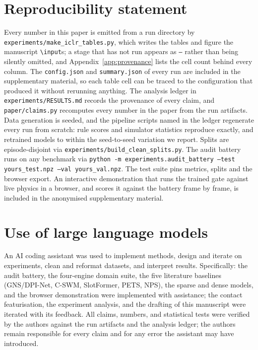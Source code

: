 \documentclass{article}
\begin{document}
\section*{Reproducibility statement}
Every number in this paper is emitted from a run directory by
\texttt{experiments/make\_iclr\_tables.py}, which writes the tables and figure the manuscript
\texttt{\textbackslash input}s; a stage that has not run appears as \texttt{--} rather than
being silently omitted, and Appendix~\ref{app:provenance} lists the cell count behind every
column. The \texttt{config.json} and \texttt{summary.json} of every run are included in the
supplementary material, so each table cell can be traced to the configuration that produced it
without rerunning anything. The analysis ledger in \texttt{experiments/RESULTS.md} records the
provenance of every claim, and \texttt{paper/claims.py} recomputes every number in the paper
from the run artifacts. Data generation is seeded, and the pipeline scripts named in the ledger
regenerate every run from scratch: rule scores and simulator statistics reproduce exactly, and
retrained models to within the seed-to-seed variation we report. Splits are episode-disjoint via
\texttt{experiments/build\_clean\_splits.py}. The audit battery runs on any benchmark via
\texttt{python -m experiments.audit\_battery --test yours\_test.npz --val yours\_val.npz}. The
test suite pins metrics, splits and the browser export. An interactive demonstration that runs
the trained gate against live physics in a browser, and scores it against the battery frame by
frame, is included in the anonymised supplementary material.

\section*{Use of large language models}
An AI coding assistant was used to implement methods, design and iterate on
experiments, clean and reformat datasets, and interpret results. Specifically:
the audit battery, the four-engine domain suite, the five literature baselines
(GNS/DPI-Net, C-SWM, SlotFormer, PETS, NPS), the sparse and dense models, and the
browser demonstration were implemented with assistance; the contact featurisation,
the experiment analysis, and the drafting of this manuscript were iterated with its
feedback. All claims, numbers, and statistical tests were verified by the authors
against the run artifacts and the analysis ledger; the authors remain responsible for
every claim and for any error the assistant may have introduced.
\end{document}
